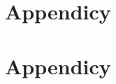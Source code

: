\documentclass[english,12pt,a4paper,pdftex]{article}
\begin{document}
\clearpage
\appendix

\section{Appendicy \label{AppendicyA}}



\clearpage
\section{Appendicy \label{AppendicyB}}


\end{document}
